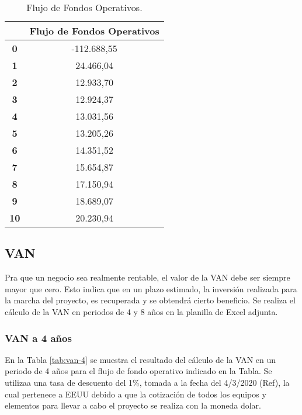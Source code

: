 \begin{table}[H]
  \small
  \centering
    \begin{tabular}{|c|c|}
    \hline
    \rowcolor[rgb]{ .773,  .851,  .945} \multicolumn{1}{|l|}{\textbf{Periodo}} & \multicolumn{1}{l|}{\textbf{Flujo de Fondos Operativos}} \bigstrut\\
    \hline
    \textbf{0} & -112.688,55 \bigstrut\\
    \hline
    \textbf{1} & 24.466,04 \bigstrut\\
    \hline
    \textbf{2} & 12.933,70 \bigstrut\\
    \hline
    \textbf{3} & 12.924,37 \bigstrut\\
    \hline
    \textbf{4} & 13.031,56 \bigstrut\\
    \hline
    \textbf{5} & 13.205,26 \bigstrut\\
    \hline
    \textbf{6} & 14.351,52 \bigstrut\\
    \hline
    \textbf{7} & 15.654,87 \bigstrut\\
    \hline
    \textbf{8} & 17.150,94 \bigstrut\\
    \hline
    \textbf{9} & 18.689,07 \bigstrut\\
    \hline
    \textbf{10} & 20.230,94 \bigstrut\\
    \hline
    \end{tabular}%
     \caption{Flujo de Fondos Operativos.}
  \label{tab:flujo-fondos-operativos}%
\end{table}%




\subsection{VAN}

Pra que un negocio sea realmente rentable, el valor de la VAN debe ser siempre mayor que cero. Esto indica que en un plazo estimado, la inversión realizada para la marcha del proyecto, es recuperada y se obtendrá cierto beneficio. Se realiza el cálculo de la VAN en periodos de 4 y 8 años en la planilla de Excel adjunta.

\subsubsection{VAN a 4 años}

En la Tabla \ref{tab:van-4} se muestra el resultado del cálculo de la VAN en un periodo de 4 años para el flujo de fondo operativo indicado en la Tabla. Se utilizaa una tasa de descuento del  1\%, tomada a la fecha del 4/3/2020 (Ref), la cual pertenece a EEUU debido a que la cotización de todos los equipos y elementos para llevar a cabo el proyecto se realiza con la moneda dolar.

